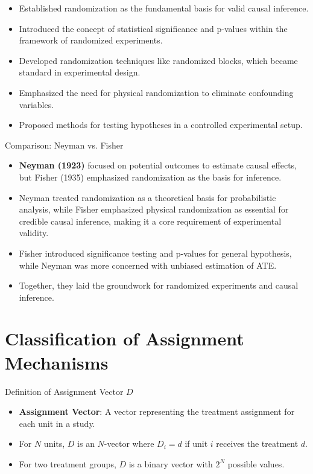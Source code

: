 \documentclass[xcolor=svgnames,t]{beamer}
\begin{document}
\begin{frame}{\cite{fisher1935}}
    \begin{itemize}[<+->]
        \item Established randomization as the fundamental basis for valid causal inference.
        \item Introduced the concept of statistical significance and p-values within the framework of randomized experiments.
        \item Developed randomization techniques like randomized blocks, which became standard in experimental design.
        \item Emphasized the need for physical randomization to eliminate confounding variables.
        \item Proposed methods for testing hypotheses in a controlled experimental setup.
    \end{itemize}
\end{frame}

\begin{frame}{Comparison: Neyman vs. Fisher}
    \begin{itemize}[<+->]
        \item \textbf{Neyman (1923)} focused on potential outcomes to estimate causal effects, but Fisher (1935) emphasized randomization as the basis for inference.
        \item Neyman treated randomization as a theoretical basis for probabilistic analysis, while Fisher emphasized physical randomization as essential for credible causal inference, making it a core requirement of experimental validity.
        \item Fisher introduced significance testing and p-values for general hypothesis, while Neyman was more concerned with unbiased estimation of ATE.
      
        \item Together, they laid the groundwork for randomized experiments and causal inference.
    \end{itemize}
\end{frame}
\section{Classification of Assignment Mechanisms}

\begin{frame}{Definition of Assignment Vector \( D \)}
    \begin{itemize}[<+->]
        \item \textbf{Assignment Vector}: A vector representing the treatment assignment for each unit in a study.
        \item For \( N \) units, \( D \) is an \( N \)-vector where \( D_i = d \) if unit \( i \) receives the treatment $d$.
        \item For two treatment groups, \( D \) is a binary vector with \( 2^N \) possible values.
    \end{itemize}
    
   
\end{frame}
\end{document}
